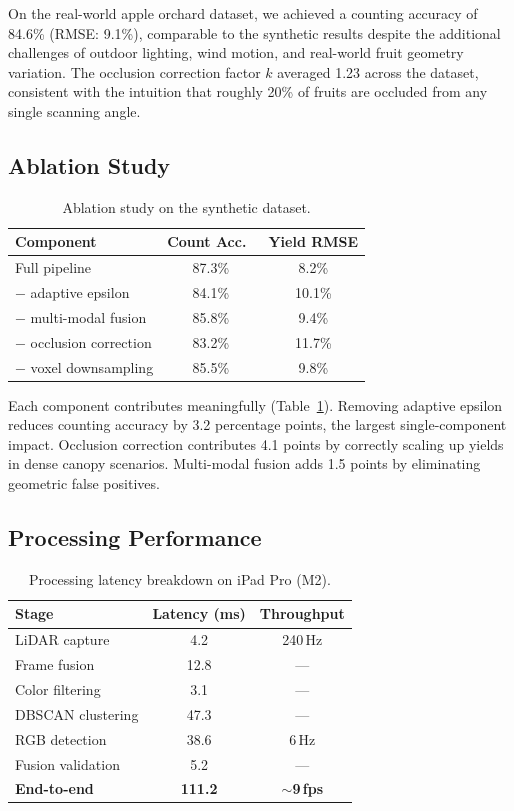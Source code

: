 \documentclass[12pt,a4paper]{article}
\begin{document}
On the real-world apple orchard dataset, we achieved a counting accuracy of 84.6\% (RMSE: 9.1\%), comparable to the synthetic results despite the additional challenges of outdoor lighting, wind motion, and real-world fruit geometry variation. The occlusion correction factor $k$ averaged 1.23 across the dataset, consistent with the intuition that roughly 20\% of fruits are occluded from any single scanning angle.

\subsection{Ablation Study}

\begin{table}[htbp]
\centering
\caption{Ablation study on the synthetic dataset.}
\label{tab:ablation}
\begin{tabular}{lcc}
\toprule
Component & Count Acc.\ & Yield RMSE \\
\midrule
Full pipeline            & 87.3\% & 8.2\% \\
$-$ adaptive epsilon    & 84.1\% & 10.1\% \\
$-$ multi-modal fusion   & 85.8\% & 9.4\%  \\
$-$ occlusion correction & 83.2\% & 11.7\% \\
$-$ voxel downsampling  & 85.5\% & 9.8\%  \\
\bottomrule
\end{tabular}
\end{table}

Each component contributes meaningfully (Table~\ref{tab:ablation}). Removing adaptive epsilon reduces counting accuracy by 3.2 percentage points, the largest single-component impact. Occlusion correction contributes 4.1 points by correctly scaling up yields in dense canopy scenarios. Multi-modal fusion adds 1.5 points by eliminating geometric false positives.

\subsection{Processing Performance}

\begin{table}[htbp]
\centering
\caption{Processing latency breakdown on iPad Pro (M2).}
\label{tab:latency}
\begin{tabular}{lcc}
\toprule
Stage & Latency (ms) & Throughput \\
\midrule
LiDAR capture      & 4.2  & 240\,Hz \\
Frame fusion       & 12.8 & ---     \\
Color filtering    & 3.1  & ---     \\
DBSCAN clustering  & 47.3 & ---     \\
RGB detection       & 38.6 & 6\,Hz   \\
Fusion validation   & 5.2  & ---     \\
\textbf{End-to-end} & \textbf{111.2} & \textbf{$\sim$9\,fps} \\
\bottomrule
\end{tabular}
\end{table}
\end{document}
